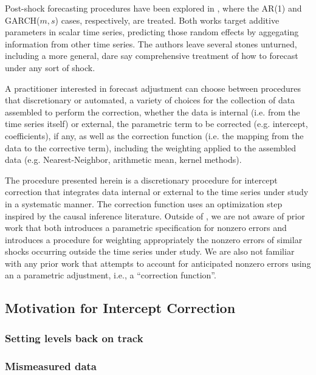 \documentclass[11pt]{article}
\theoremstyle{definition}
\begin{document}
Post-shock forecasting procedures have been explored in \cite{lin2021minimizing,lundquist2024volatility}, where the AR(1) and GARCH($m,s$) cases, respectively, are treated.  Both works target additive parameters in scalar time series, predicting those random effects by aggegating information from other time series.  The authors leave several stones unturned, including a more general, dare say comprehensive treatment of how to forecast under any sort of shock.

A practitioner interested in forecast adjustment can choose between procedures that discretionary or automated, a variety of choices for the collection of data assembled to perform the correction, whether the data is internal (i.e. from the time series itself) or external, the parametric term to be corrected (e.g. intercept, coefficients), if any, as well as the correction function (i.e. the mapping from the data to the corrective term), including the weighting applied to the assembled data (e.g. Nearest-Neighbor, arithmetic mean, kernel methods).

The procedure presented herein is a discretionary procedure for intercept correction that integrates data internal or external to the time series under study in a systematic manner.  The correction function uses an optimization step inspired by the causal inference literature.  Outside of \citet{lin2021minimizing,lundquist2024volatility}, we are not aware of prior work that both introduces a parametric specification for nonzero errors and introduces a procedure for weighting appropriately the nonzero errors of similar shocks occurring outside the time series under study.  We are also not familiar with any prior work that attempts to account for anticipated nonzero errors using an a parametric adjustment, i.e., a ``correction function''.  

\subsection{Motivation for Intercept Correction}

\subsubsection{Setting levels back on track}

\subsubsection{Mismeasured data}
\end{document}
